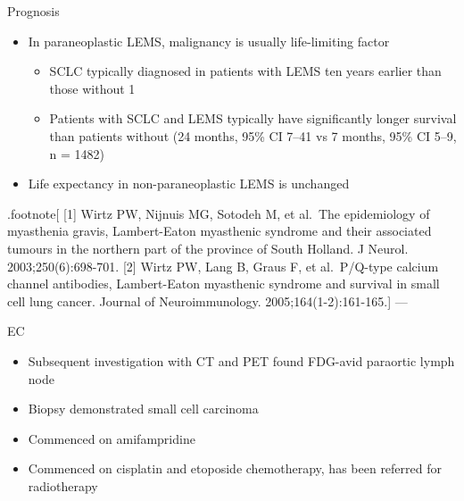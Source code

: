 \documentclass[
  ignorenonframetext,
]{beamer}
\providecommand{\tightlist}{%
  \setlength{\itemsep}{0pt}\setlength{\parskip}{0pt}}
\begin{document}
\begin{frame}{Prognosis}
\protect\hypertarget{prognosis}{}
\begin{itemize}
\tightlist
\item
  In paraneoplastic LEMS, malignancy is usually life-limiting factor

  \begin{itemize}
  \tightlist
  \item
    SCLC typically diagnosed in patients with LEMS ten years earlier
    than those without 1
  \item
    Patients with SCLC and LEMS typically have significantly longer
    survival than patients without (24 months, 95\% CI 7--41 vs 7
    months, 95\% CI 5--9, n = 1482)
  \end{itemize}
\item
  Life expectancy in non-paraneoplastic LEMS is unchanged
\end{itemize}

.footnote{[} {[}1{]} Wirtz PW, Nijnuis MG, Sotodeh M, et al.~The
epidemiology of myasthenia gravis, Lambert-Eaton myasthenic syndrome and
their associated tumours in the northern part of the province of South
Holland. J Neurol. 2003;250(6):698-701. {[}2{]} Wirtz PW, Lang B, Graus
F, et al.~P/Q-type calcium channel antibodies, Lambert-Eaton myasthenic
syndrome and survival in small cell lung cancer. Journal of
Neuroimmunology. 2005;164(1-2):161-165.{]} ---
\end{frame}

\begin{frame}{EC}
\protect\hypertarget{ec-1}{}
\begin{itemize}
\tightlist
\item
  Subsequent investigation with CT and PET found FDG-avid paraortic
  lymph node
\item
  Biopsy demonstrated small cell carcinoma
\item
  Commenced on amifampridine
\item
  Commenced on cisplatin and etoposide chemotherapy, has been referred
  for radiotherapy
\end{itemize}
\end{frame}
\end{document}
